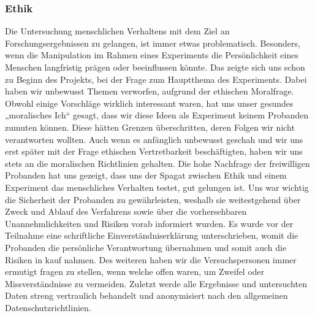 \documentclass{Bericht}
\begin{document}
\subsubsection{Ethik}
Die Untersuchung menschlichen Verhaltens mit dem Ziel an Forschungsergebnissen zu gelangen,
ist immer etwas problematisch. Besonders, wenn die Manipulation im Rahmen eines Experiments
die Persönlichkeit eines Menschen langfristig prägen oder beeinflussen könnte. Das
zeigte sich uns schon zu Beginn des Projekts, bei der Frage zum Hauptthema des Experiments.
Dabei haben wir unbewusst Themen verworfen, aufgrund der ethischen Moralfrage. Obwohl
einige Vorschläge wirklich interessant waren, hat uns unser gesundes „moralisches Ich“ gesagt,
dass wir diese Ideen als Experiment keinem Probanden zumuten können. Diese hätten
Grenzen überschritten, deren Folgen wir nicht verantworten wollten. Auch wenn es anfänglich
unbewusst geschah und wir uns erst später mit der Frage ethischen Vertretbarkeit beschäftigten,
haben wir uns stets an die moralischen Richtlinien gehalten. Die hohe Nachfrage der freiwilligen
Probanden hat uns gezeigt, dass uns der Spagat zwischen Ethik und einem Experiment
das menschliches Verhalten testet, gut gelungen ist. Uns war wichtig die Sicherheit der Probanden
zu gewährleisten, weshalb sie weitestgehend über Zweck und Ablauf des Verfahrens
sowie über die vorhersehbaren Unannehmlichkeiten und Risiken vorab informiert wurden. Es
wurde vor der Teilnahme eine schriftliche Einverständniserklärung unterschrieben, womit die Probanden die persönliche Verantwortung übernahmen und somit auch die Risiken in kauf
nahmen. Des weiteren haben wir die Versuchspersonen immer ermutigt fragen zu stellen,
wenn welche offen waren, um Zweifel oder Missverständnisse zu vermeiden. Zuletzt werde alle
Ergebnisse und untersuchten Daten streng vertraulich behandelt und anonymisiert nach den
allgemeinen Datenschutzrichtlinien.
\end{document}
